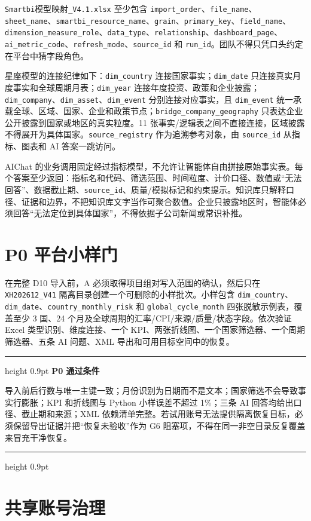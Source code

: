 \documentclass[UTF8,fontset=windows,12pt,openany]{ctexbook}
\newenvironment{gatebox}[1][]{%
  \par\medskip\noindent\begin{center}\begin{minipage}{0.93\textwidth}%
  \color{GoldLine}\hrule height 0.9pt\vspace{0.45em}%
  \textbf{#1}\par\smallskip\color{black}%
}{%
  \par\vspace{0.35em}\color{GoldLine}\hrule height 0.9pt%
  \end{minipage}\end{center}\medskip%
}
\newcommand{\Field}[1]{{\small\nolinkurl{#1}}}
\newcommand{\File}[1]{{\small\begingroup\urlstyle{same}\nolinkurl{#1}\endgroup}}
\begin{document}
\File{Smartbi}\textsf{模型映射}\File{_V4.1.xlsx} 至少包含 \Field{import_order}、\Field{file_name}、\Field{sheet_name}、\Field{smartbi_resource_name}、\Field{grain}、\Field{primary_key}、\Field{field_name}、\Field{dimension_measure_role}、\Field{data_type}、\Field{relationship}、\Field{dashboard_page}、\Field{ai_metric_code}、\Field{refresh_mode}、\Field{source_id} 和 \Field{run_id}。团队不得只凭口头约定在平台中猜字段角色。

星座模型的连接纪律如下：\Field{dim_country} 连接国家事实；\Field{dim_date} 只连接真实月度事实和全球周期月表；\Field{dim_year} 连接年度投资、政策和企业披露；\Field{dim_company}、\Field{dim_asset}、\Field{dim_event} 分别连接对应事实，且 \Field{dim_event} 统一承载全球、区域、国家、企业和政策节点；\Field{bridge_company_geography} 只表达企业公开披露到国家或地区的真实粒度。11 张事实/逻辑表之间不直接连接，区域披露不得展开为具体国家。\Field{source_registry} 作为追溯参考对象，由 \Field{source_id} 从指标、图表和 AI 答案一跳访问。

AIChat 的业务调用固定经过指标模型，不允许让智能体自由拼接原始事实表。每个答案至少返回：指标名和代码、筛选范围、时间粒度、计价口径、数值或“无法回答”、数据截止期、\Field{source_id}、质量/模拟标记和约束提示。知识库只解释口径、证据和边界，不把知识库文字当作可聚合数值。企业只披露地区时，智能体必须回答“无法定位到具体国家”，不得依据子公司新闻或常识补推。

\section{P0 平台小样门}

在完整 D10 导入前，A 必须取得项目组对写入范围的确认，然后只在 \Field{XH202612_V41} 隔离目录创建一个可删除的小样批次。小样包含 \Field{dim_country}、\Field{dim_date}、\Field{country_monthly_risk} 和 \Field{global_cycle_month} 四张脱敏示例表，覆盖至少 3 国、24 个月及全球周期的汇率/CPI/来源/质量/状态字段。依次验证 Excel 类型识别、维度连接、一个 KPI、两张折线图、一个国家筛选器、一个周期筛选器、五条 AI 问题、XML 导出和可用目标空间中的恢复。

\begin{gatebox}[P0 通过条件]
导入前后行数与唯一主键一致；月份识别为日期而不是文本；国家筛选不会导致事实行膨胀；KPI 和折线图与 Python 小样误差不超过 1\%；三条 AI 回答均给出口径、截止期和来源；XML 依赖清单完整。若试用账号无法提供隔离恢复目标，必须保留导出证据并把“恢复未验收”作为 G6 阻塞项，不得在同一非空目录反复覆盖来冒充干净恢复。
\end{gatebox}

\section{共享账号治理}
\end{document}
